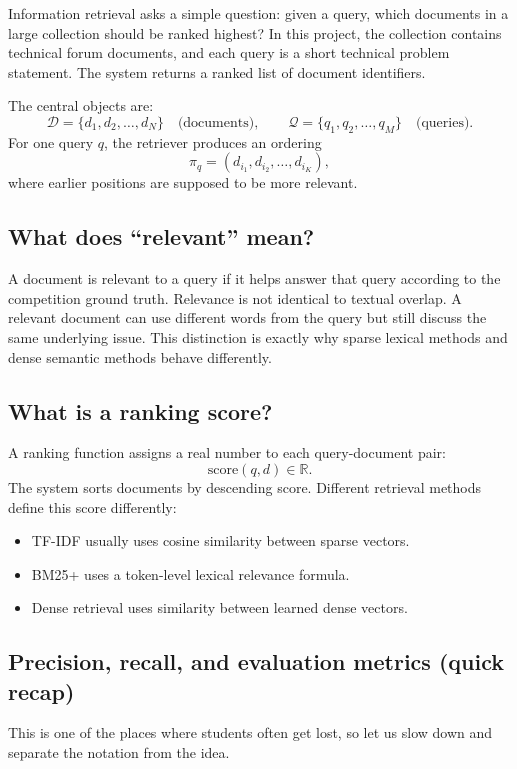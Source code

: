 \documentclass[10pt]{article}
\begin{document}
Information retrieval asks a simple question: given a query, which documents in a large collection should be ranked highest? In this project, the collection contains technical forum documents, and each query is a short technical problem statement. The system returns a ranked list of document identifiers.

The central objects are:
\[
\mathcal{D} = \{d_1,d_2,\dots,d_N\} \quad \text{(documents)},
\qquad
\mathcal{Q} = \{q_1,q_2,\dots,q_M\} \quad \text{(queries)}.
\]
For one query \(q\), the retriever produces an ordering
\[
\pi_q = (d_{i_1}, d_{i_2}, \dots, d_{i_K}),
\]
where earlier positions are supposed to be more relevant.

\subsection{What does ``relevant'' mean?}

A document is relevant to a query if it helps answer that query according to the competition ground truth. Relevance is not identical to textual overlap. A relevant document can use different words from the query but still discuss the same underlying issue. This distinction is exactly why sparse lexical methods and dense semantic methods behave differently.

\subsection{What is a ranking score?}

A ranking function assigns a real number to each query-document pair:
\[
\mathrm{score}(q,d) \in \mathbb{R}.
\]
The system sorts documents by descending score. Different retrieval methods define this score differently:
\begin{itemize}
    \item TF-IDF usually uses cosine similarity between sparse vectors.
    \item BM25+ uses a token-level lexical relevance formula.
    \item Dense retrieval uses similarity between learned dense vectors.
\end{itemize}

\subsection{Precision, recall, and evaluation metrics (quick recap)}

This is one of the places where students often get lost, so let us slow down and separate the notation from the idea.
\end{document}
